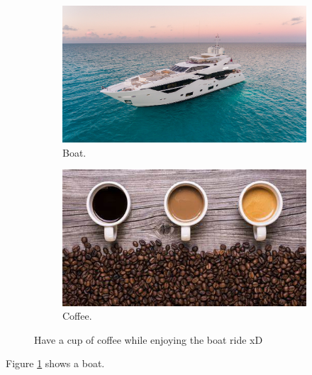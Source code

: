 \documentclass{article}
\begin{document}
\begin{figure}[h!]
  \centering
  \begin{subfigure}[b]{0.4\linewidth}
    \includegraphics[width=\linewidth]{boat.jpg}
    \caption{Boat.}
  \end{subfigure}
  \begin{subfigure}[b]{0.4\linewidth}
    \includegraphics[width=\linewidth]{coffee.jpg}
    \caption{Coffee.}
  \end{subfigure}
  \caption{Have a cup of coffee while enjoying the boat ride xD}
  \label{fig:boatandcoffee}
\end{figure}

Figure \ref{fig:boatandcoffee} shows a boat.
\end{document}

